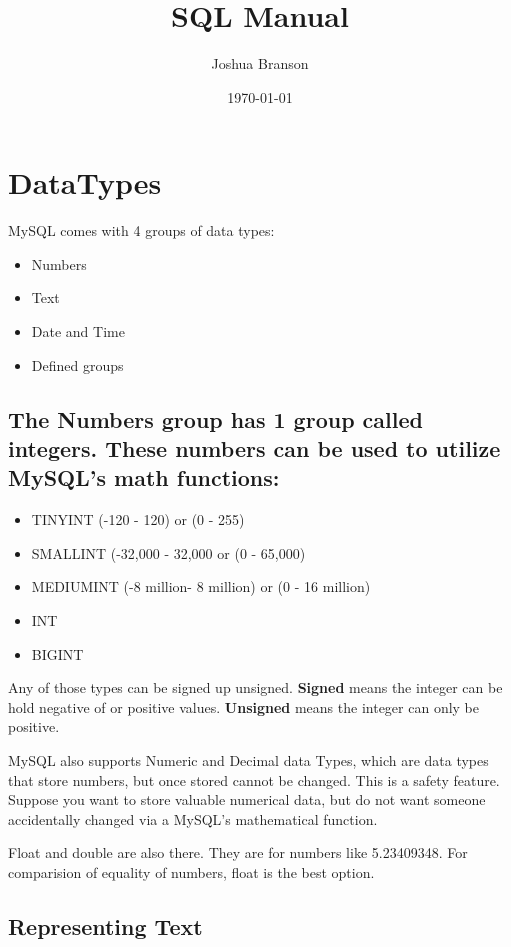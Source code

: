 \documentclass[11pt]{article}
\author{Joshua Branson}
\date{\today}
\title{SQL Manual}
\begin{document}
\maketitle
\tableofcontents



\section{DataTypes}
\label{sec-1}

MySQL comes with 4 groups of data types:

\begin{itemize}
\item Numbers
\item Text
\item Date and Time
\item Defined groups
\end{itemize}

\subsection{The Numbers group has 1 group called integers.  These numbers can be used to utilize MySQL’s math functions:}
\label{sec-1-1}
\begin{itemize}
\item TINYINT   (-120 - 120)            or (0 - 255)
\item SMALLINT  (-32,000 - 32,000       or (0 - 65,000)
\item MEDIUMINT (-8 million- 8 million) or (0 - 16 million)
\item INT
\item BIGINT
\end{itemize}

Any of those types can be signed up unsigned.  \textbf{Signed} means the integer can be hold negative of or positive values.
\textbf{Unsigned} means the integer can only be positive.

MySQL also supports Numeric and Decimal data Types, which are data types that store numbers, but once stored cannot be changed.
This is a safety feature.  Suppose you want to store valuable numerical data, but do not want someone accidentally changed via a
MySQL’s mathematical function.

Float and double are also there.  They are for numbers like 5.23409348.  For comparision of equality of numbers, float is the
best option.

\subsection{Representing Text}
\label{sec-1-2}
\end{document}
